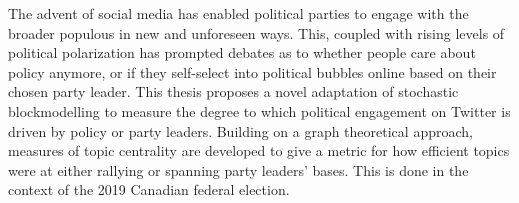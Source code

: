 The advent of social media has enabled political parties to engage with the
broader populous in new and unforeseen ways. This, coupled with rising levels of
political polarization has prompted debates as to whether people care about
policy anymore, or if they self-select into political bubbles online based on
their chosen party leader. This thesis proposes a novel adaptation of stochastic
blockmodelling to measure the degree to which political engagement on Twitter is
driven by policy or party leaders. Building on a graph theoretical approach,
measures of topic centrality are developed to give a metric for how efficient
topics were at either rallying or spanning party leaders' bases. This is done in
the context of the 2019 Canadian federal election.
